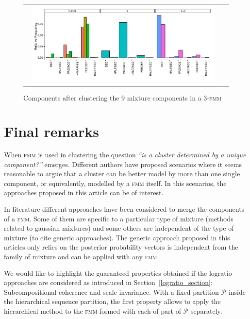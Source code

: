 \documentclass[submit]{smj}
\theoremstyle{definition}
\newcommand{\fmm}{\textsc{fmm}\xspace}
\begin{document}
\begin{figure}[t]
\begin{center}
\begin{tabular}{cc}
  \includegraphics[width=0.95\textwidth]{figures/multinomial_clust3_all.pdf} \\
 \end{tabular}
 \caption{Components after clustering the 9 mixture components in a 3-\fmm}\label{multinomial_clust3}
\end{center}
\end{figure}

\section{Final remarks}\label{remarks}

When \fmm is used in clustering the question \textit{``is a cluster determined by a unique component?''} emerges. Different authors have proposed scenarios where it seems reasonable to argue that a cluster can be better model by more than one single component, or equivalently, modelled by a \fmm itself. In this scenarios, the approaches proposed in this article can be of interest.

In literature different approaches have been considered to merge the components of a \fmm. Some of them are specific to a particular type of mixture (methods related to gaussian mixtures) and some others are independent of the type of mixture (to cite generic approaches). The generic approach proposed in this articles only relies  on the posterior probability vectors is independent from the family of mixture and can be applied with any \fmm.

We would like to highlight the guaranteed properties obtained if the logratio approaches are considered as introduced in Section~\ref{logratio_section}: Subcompositional coherence and scale invariance. With a fixed partition $\mathcal{P}$ inside the hierarchical sequence partition, the first property allows to apply the hierarchical method to the \fmm formed with each of part of $\mathcal{P}$ separately.
\end{document}
